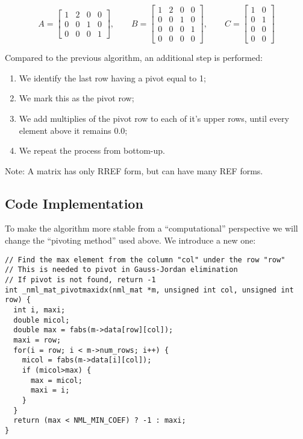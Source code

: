$$
A=
\begin{bmatrix}
1 & 2 & 0 & 0 \\
0 & 0 & 1 & 0 \\
0 & 0 & 0 & 1
\end{bmatrix}
, \qquad
B=
\begin{bmatrix}
1 & 2 & 0 & 0 \\
0 & 0 & 1 & 0 \\
0 & 0 & 0 & 1 \\
0 & 0 & 0 & 0
\end{bmatrix}
, \qquad
C=
\begin{bmatrix}
1 & 0 \\
0 & 1 \\
0 & 0 \\
0 & 0
\end{bmatrix}
$$

Compared to the previous algorithm, an additional step is performed:

\begin{enumerate} 
\item We identify the last row having a pivot equal to 1;
\item We mark this as the pivot row;
\item We add multiplies of the pivot row to each of it’s upper rows, until every element above it remains 0.0;
\item We repeat the process from bottom-up.
\end{enumerate}

Note: A matrix has only RREF form, but can have many REF forms.

\subsection{Code Implementation}

To make the algorithm more stable from a ``computational'' perspective we will change the ``pivoting method'' used above. We introduce a new one:

\begin{verbatim}
// Find the max element from the column "col" under the row "row"
// This is needed to pivot in Gauss-Jordan elimination
// If pivot is not found, return -1
int _nml_mat_pivotmaxidx(nml_mat *m, unsigned int col, unsigned int row) {
  int i, maxi;
  double micol;
  double max = fabs(m->data[row][col]);
  maxi = row;
  for(i = row; i < m->num_rows; i++) {
    micol = fabs(m->data[i][col]);
    if (micol>max) {
      max = micol;
      maxi = i;
    }
  }
  return (max < NML_MIN_COEF) ? -1 : maxi;
} 
\end{verbatim}

